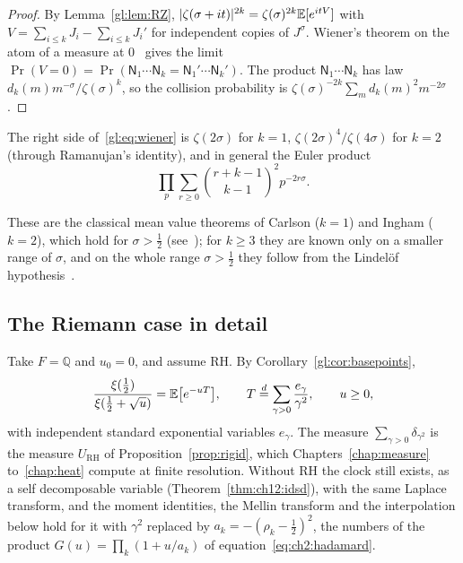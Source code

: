 \begin{proof}
By Lemma~\ref{gl:lem:RZ}, $|\zeta(\sigma+it)|^{2k} = \zeta(\sigma)^{2k}\mathbb{E}[e^{itV}]$ with $V = \sum_{i\le k}J_i - \sum_{i\le k}J_i'$ for independent copies of $J^\sigma$. Wiener's theorem on the atom of a measure at $0$~\cite{Wiener33} gives the limit $\Pr(V=0)=\Pr(\mathsf N_1\cdots\mathsf N_k=\mathsf N_1'\cdots\mathsf N_k')$. The product $\mathsf N_1\cdots\mathsf N_k$ has law $d_k(m)m^{-\sigma}/\zeta(\sigma)^k$, so the collision probability is $\zeta(\sigma)^{-2k}\sum_md_k(m)^2m^{-2\sigma}$.
\end{proof}

\begin{corollary}\label{gl:cor:classical}
The right side of~\eqref{gl:eq:wiener} is $\zeta(2\sigma)$ for $k=1$, $\zeta(2\sigma)^4/\zeta(4\sigma)$ for $k=2$ (through Ramanujan's identity), and in general the Euler product
\[
\prod_p\sum_{r\ge0}\binom{r+k-1}{k-1}^2p^{-2r\sigma}.
\]
\end{corollary}

These are the classical mean value theorems of Carlson ($k=1$) and Ingham ($k=2$), which hold for $\sigma>\tfrac12$ (see~\cite[Chapter~VII]{Titchmarsh}); for $k\ge3$ they are known only on a smaller range of $\sigma$, and on the whole range $\sigma>\tfrac12$ they follow from the Lindel\"of hypothesis~\cite[Chapter~XIII]{Titchmarsh}.

\subsection{The Riemann case in detail}\label{gl:sec:critical}

Take $F=\mathbb Q$ and $u_0=0$, and assume RH. By Corollary~\ref{gl:cor:basepoints},
\begin{equation}\label{gl:eq:thorin}
\frac{\xi(\tfrac12)}{\xi(\tfrac12+\sqrt u)}=\mathbb{E}\big[e^{-uT}\big],\qquad T\stackrel{d}{=}\sum_{\gamma>0}\frac{e_\gamma}{\gamma^2},\qquad u\ge0,
\end{equation}
with independent standard exponential variables $e_\gamma$. The measure $\sum_{\gamma>0}\delta_{\gamma^2}$ is the measure $U_{\mathrm{RH}}$ of Proposition~\ref{prop:rigid}, which Chapters~\ref{chap:measure} to~\ref{chap:heat} compute at finite resolution. Without RH the clock still exists, as a self decomposable variable (Theorem~\ref{thm:ch12:idsd}), with the same Laplace transform, and the moment identities, the Mellin transform and the interpolation below hold for it with $\gamma^2$ replaced by $a_k=-(\rho_k-\tfrac12)^2$, the numbers of the product $G(u)=\prod_k(1+u/a_k)$ of equation~\eqref{eq:ch2:hadamard}.


